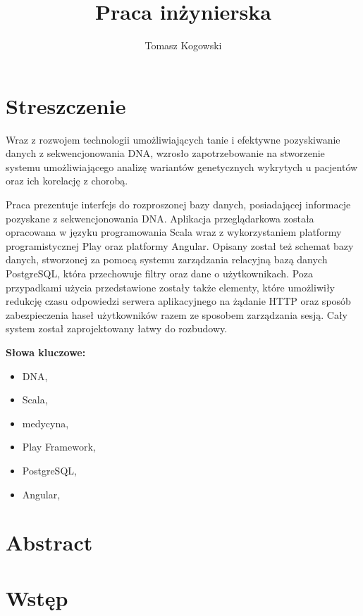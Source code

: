 \documentclass[a4paper,12pt,twoside]{article}
\title{Praca inżynierska}
\author{Tomasz Kogowski}
\begin{document}

\newpage 
\section*{Streszczenie}

Wraz z rozwojem technologii umożliwiających tanie i efektywne
pozyskiwanie danych z sekwencjonowania DNA, wzrosło zapotrzebowanie
na stworzenie systemu umożliwiającego analizę wariantów genetycznych wykrytych u pacjentów oraz ich korelację z chorobą.

Praca prezentuje interfejs do rozproszonej bazy danych, posiadającej
informacje pozyskane z sekwencjonowania DNA. Aplikacja przeglądarkowa została opracowana
w języku programowania Scala wraz z wykorzystaniem platformy programistycznej
Play oraz platformy Angular. Opisany został też schemat bazy danych,
stworzonej za pomocą systemu zarządzania relacyjną bazą danych PostgreSQL, która
przechowuje filtry oraz dane o użytkownikach.
Poza przypadkami użycia przedstawione zostały także
elementy, które umożliwiły redukcję czasu odpowiedzi serwera
aplikacyjnego na żądanie HTTP oraz sposób zabezpieczenia
haseł użytkowników razem ze sposobem zarządzania sesją.
Cały system został zaprojektowany łatwy do rozbudowy.

\textbf{Słowa kluczowe:}
\begin{itemize}
\item DNA,
\item Scala,
\item medycyna,
\item Play Framework,
\item PostgreSQL,
\item Angular,
\end{itemize}
\newpage
\section*{Abstract}

\newpage

\newpage
\tableofcontents

\newpage
\section{Wstęp}
\end{document}
